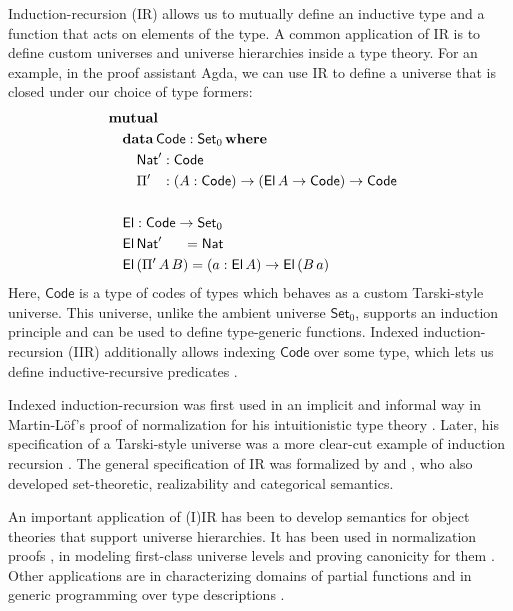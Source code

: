 \documentclass[acmsmall,screen,review,anonymous]{acmart}
\newcommand{\msf}[1]{{\mathsf{#1}}}
\newcommand{\mbf}[1]{{\mathbf{#1}}}
\newcommand{\data}{\mbf{data}}
\newcommand{\Set}{\msf{Set}}
\newcommand{\where}{\mbf{where}}
\newcommand{\Nat}{\msf{Nat}}
\newcommand{\El}{\msf{El}}
\newcommand{\Code}{\msf{Code}}
\begin{document}
Induction-recursion (IR) allows us to mutually define an inductive type and a function that acts on
elements of the type. A common application of IR is to define custom universes and universe
hierarchies inside a type theory. For an example, in the proof assistant Agda, we can use IR to
define a universe that is closed under our choice of type formers:
\begin{alignat*}{3}
  & \mbf{mutual} \\
  & \quad\data\,\Code : \Set_0\,\where \\
  & \quad\quad \Nat' : \Code\\
  & \quad\quad \Pi' \hspace{0.8em} : (A : \Code) \to (\El\,A \to \Code) \to \Code
  & \\
  & \\
  & \quad\El : \Code \to \Set_0 \\
  & \quad\El\,\Nat'\hspace{1.5em}  = \Nat \\
  & \quad\El\,(\Pi'\,A\,B) = (a : \El\,A) \to \El\,(B\,a)
\end{alignat*}
Here, $\Code$ is a type of codes of types which behaves as a custom Tarski-style universe. This
universe, unlike the ambient universe $\Set_0$, supports an induction principle and can be used to
define type-generic functions. Indexed induction-recursion (IIR) additionally allows indexing
$\Code$ over some type, which lets us define inductive-recursive predicates \cite{DBLP:journals/jlp/DybjerS06}.

Indexed induction-recursion was first used in an implicit and informal way in Martin-Löf's proof of
normalization for his intuitionistic type theory \cite{martin1975intuitionistic}. Later, his
specification of a Tarski-style universe was a more clear-cut example of induction recursion
\cite{martinlof84sambin}. The general specification of IR was formalized by
\citet{DBLP:journals/jsyml/Dybjer00} and
\citet{dybjer99finite,DBLP:journals/jlp/DybjerS06,DBLP:journals/apal/DybjerS03}, who also developed
set-theoretic, realizability and categorical semantics.

An important application of (I)IR has been to develop semantics for object theories that support
universe hierarchies. It has been used in normalization proofs
\cite{DBLP:journals/pacmpl/0001OV18,DBLP:journals/pacmpl/PujetT23,DBLP:journals/pacmpl/AbelDE23}, in
modeling first-class universe levels \cite{first-class-univ} and proving canonicity for them
\cite{DBLP:journals/corr/abs-2502-20485}. Other applications are in characterizing domains of
partial functions \cite{DBLP:conf/tphol/BoveC01} and in generic programming over type descriptions
\cite{DBLP:journals/njc/BenkeDJ03,diehl2017fully}.
\end{document}
